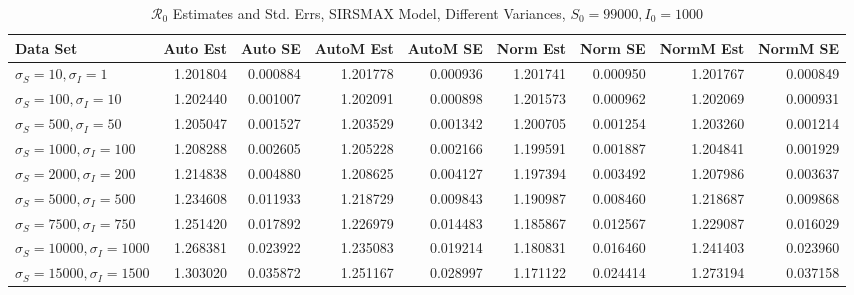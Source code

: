 \documentclass[12pt]{article}
\newcommand{\rr}{\ensuremath{\mathcal{R}_0}}
\begin{document}
\begin{table}[H]
	
	\caption{$\rr$ Estimates and Std. Errs, SIRSMAX Model,
		Different Variances, 
		$S_0 = 99000, I_0 = 1000$}
	\begin{footnotesize}
		\hskip -1.7cm
	\begin{tabular}{l|r|r|r|r|r|r|r|r}
		\hline
		Data Set & Auto Est & Auto SE & AutoM Est & AutoM SE & Norm Est & Norm SE & NormM Est & NormM SE\\
		\hline
		$\sigma_S = 10, \sigma_I = 1$ & 1.201804 & 0.000884 & 1.201778 & 0.000936 & 1.201741 & 0.000950 & 1.201767 & 0.000849\\
		\hline
		$\sigma_S = 100, \sigma_I = 10$ & 1.202440 & 0.001007 & 1.202091 & 0.000898 & 1.201573 & 0.000962 & 1.202069 & 0.000931\\
		\hline
		$\sigma_S = 500, \sigma_I = 50$ & 1.205047 & 0.001527 & 1.203529 & 0.001342 & 1.200705 & 0.001254 & 1.203260 & 0.001214\\
		\hline
		$\sigma_S = 1000, \sigma_I = 100$ & 1.208288 & 0.002605 & 1.205228 & 0.002166 & 1.199591 & 0.001887 & 1.204841 & 0.001929\\
		\hline
		$\sigma_S = 2000, \sigma_I = 200$ & 1.214838 & 0.004880 & 1.208625 & 0.004127 & 1.197394 & 0.003492 & 1.207986 & 0.003637\\
		\hline
		$\sigma_S = 5000, \sigma_I = 500$ & 1.234608 & 0.011933 & 1.218729 & 0.009843 & 1.190987 & 0.008460 & 1.218687 & 0.009868\\
		\hline
		$\sigma_S = 7500, \sigma_I = 750$ & 1.251420 & 0.017892 & 1.226979 & 0.014483 & 1.185867 & 0.012567 & 1.229087 & 0.016029\\
		\hline
		$\sigma_S = 10000, \sigma_I = 1000$ & 1.268381 & 0.023922 & 1.235083 & 0.019214 & 1.180831 & 0.016460 & 1.241403 & 0.023960\\
		\hline
		$\sigma_S = 15000, \sigma_I = 1500$ & 1.303020 & 0.035872 & 1.251167 & 0.028997 & 1.171122 & 0.024414 & 1.273194 & 0.037158\\
		\hline
	\end{tabular}
\end{footnotesize}
\end{table}
\end{document}
